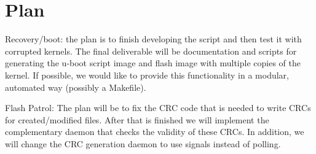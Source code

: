 \section{Plan}

Recovery/boot: the plan is to finish developing the script and then test it with
corrupted kernels.  The final deliverable will be documentation and scripts for
generating the u-boot script image and flash image with multiple copies of the
kernel.  If possible, we would like to provide this functionality in a modular,
automated way (possibly a Makefile).

Flash Patrol: The plan will be to fix the CRC code that is needed to write
CRCs for created/modified files. After that is finished we will implement the 
complementary daemon that checks the validity of these CRCs. In addition, 
we will change the CRC generation daemon to use signals instead of polling.